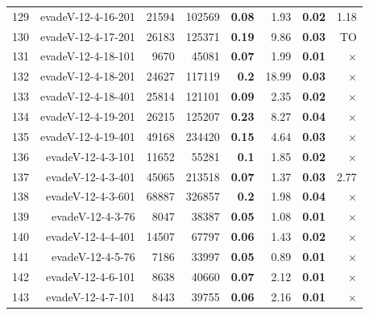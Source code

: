\begin{longtable}{lrr@{\hskip 12pt}r@{\hskip 12pt}r@{\hskip 12pt}r@{\hskip 12pt}r@{\hskip 12pt}r}
129 & \multirow{1}{*}{evadeV-12-4-16-201} & \multirow{1}{*}{21594} & \multirow{1}{*}{102569} & \textbf{0.08} & 1.93 & \textbf{0.02} & 1.18 \\
130 & \multirow{1}{*}{evadeV-12-4-17-201} & \multirow{1}{*}{26183} & \multirow{1}{*}{125371} & \textbf{0.19} & 9.86 & \textbf{0.03} & TO \\
131 & \multirow{1}{*}{evadeV-12-4-18-101} & \multirow{1}{*}{9670} & \multirow{1}{*}{45081} & \textbf{0.07} & 1.99 & \textbf{0.01} & $\times$ \\
132 & \multirow{1}{*}{evadeV-12-4-18-201} & \multirow{1}{*}{24627} & \multirow{1}{*}{117119} & \textbf{0.2} & 18.99 & \textbf{0.03} & $\times$ \\
133 & \multirow{1}{*}{evadeV-12-4-18-401} & \multirow{1}{*}{25814} & \multirow{1}{*}{121101} & \textbf{0.09} & 2.35 & \textbf{0.02} & $\times$ \\
134 & \multirow{1}{*}{evadeV-12-4-19-201} & \multirow{1}{*}{26215} & \multirow{1}{*}{125207} & \textbf{0.23} & 8.27 & \textbf{0.04} & $\times$ \\
135 & \multirow{1}{*}{evadeV-12-4-19-401} & \multirow{1}{*}{49168} & \multirow{1}{*}{234420} & \textbf{0.15} & 4.64 & \textbf{0.03} & $\times$ \\
136 & \multirow{1}{*}{evadeV-12-4-3-101} & \multirow{1}{*}{11652} & \multirow{1}{*}{55281} & \textbf{0.1} & 1.85 & \textbf{0.02} & $\times$ \\
137 & \multirow{1}{*}{evadeV-12-4-3-401} & \multirow{1}{*}{45065} & \multirow{1}{*}{213518} & \textbf{0.07} & 1.37 & \textbf{0.03} & 2.77 \\
138 & \multirow{1}{*}{evadeV-12-4-3-601} & \multirow{1}{*}{68887} & \multirow{1}{*}{326857} & \textbf{0.2} & 1.98 & \textbf{0.04} & $\times$ \\
139 & \multirow{1}{*}{evadeV-12-4-3-76} & \multirow{1}{*}{8047} & \multirow{1}{*}{38387} & \textbf{0.05} & 1.08 & \textbf{0.01} & $\times$ \\
140 & \multirow{1}{*}{evadeV-12-4-4-401} & \multirow{1}{*}{14507} & \multirow{1}{*}{67797} & \textbf{0.06} & 1.43 & \textbf{0.02} & $\times$ \\
141 & \multirow{1}{*}{evadeV-12-4-5-76} & \multirow{1}{*}{7186} & \multirow{1}{*}{33997} & \textbf{0.05} & 0.89 & \textbf{0.01} & $\times$ \\
142 & \multirow{1}{*}{evadeV-12-4-6-101} & \multirow{1}{*}{8638} & \multirow{1}{*}{40660} & \textbf{0.07} & 2.12 & \textbf{0.01} & $\times$ \\
143 & \multirow{1}{*}{evadeV-12-4-7-101} & \multirow{1}{*}{8443} & \multirow{1}{*}{39755} & \textbf{0.06} & 2.16 & \textbf{0.01} & $\times$ \\

\end{longtable}
